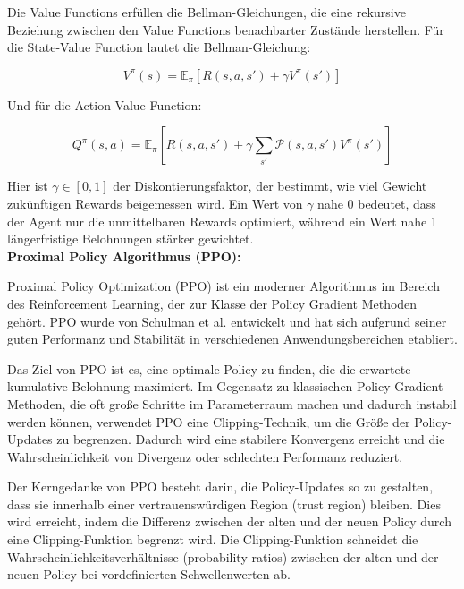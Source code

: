 \documentclass{article}
\theoremstyle{newline}
\begin{document}
\begin{onehalfspace}
Die Value Functions erfüllen die Bellman-Gleichungen, die eine rekursive Beziehung zwischen den Value Functions benachbarter Zustände herstellen. Für die State-Value Function lautet die Bellman-Gleichung:

\begin{equation}
	V^\pi(s) = \mathbb{E}_\pi \left[ R(s, a, s') + \gamma V^\pi(s') \right]
\end{equation}

Und für die Action-Value Function:

\begin{equation}
	Q^\pi(s, a) = \mathbb{E}_\pi \left[ R(s, a, s') + \gamma \sum_{s'} \mathcal{P}(s, a, s') V^\pi(s') \right]
\end{equation}

Hier ist $\gamma \in [0, 1]$ der Diskontierungsfaktor, der bestimmt, wie viel Gewicht zukünftigen Rewards beigemessen wird. Ein Wert von $\gamma$ nahe 0 bedeutet, dass der Agent nur die unmittelbaren Rewards optimiert, während ein Wert nahe 1 längerfristige Belohnungen stärker gewichtet.
\\

\textbf{Proximal Policy Algorithmus (PPO):}
\smallskip

Proximal Policy Optimization (PPO) ist ein moderner Algorithmus im Bereich des Reinforcement Learning, der zur Klasse der Policy Gradient Methoden gehört. PPO wurde von Schulman et al. \cite{schulman2017proximal} entwickelt und hat sich aufgrund seiner guten Performanz und Stabilität in verschiedenen Anwendungsbereichen etabliert.
\medskip

Das Ziel von PPO ist es, eine optimale Policy zu finden, die die erwartete kumulative Belohnung maximiert. Im Gegensatz zu klassischen Policy Gradient Methoden, die oft große Schritte im Parameterraum machen und dadurch instabil werden können, verwendet PPO eine Clipping-Technik, um die Größe der Policy-Updates zu begrenzen. Dadurch wird eine stabilere Konvergenz erreicht und die Wahrscheinlichkeit von Divergenz oder schlechten Performanz reduziert.
\medskip

Der Kerngedanke von PPO besteht darin, die Policy-Updates so zu gestalten, dass sie innerhalb einer vertrauenswürdigen Region (trust region) bleiben. Dies wird erreicht, indem die Differenz zwischen der alten und der neuen Policy durch eine Clipping-Funktion begrenzt wird. Die Clipping-Funktion schneidet die Wahrscheinlichkeitsverhältnisse (probability ratios) zwischen der alten und der neuen Policy bei vordefinierten Schwellenwerten ab.
\medskip


\end{onehalfspace}
\end{document}

